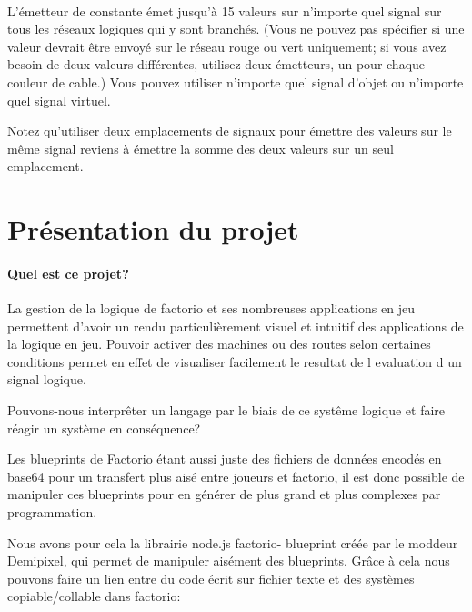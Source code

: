 \documentclass{scrreprt}
\begin{document}
	\paragraph{}
	L'émetteur de constante émet jusqu'à 15 valeurs sur n'importe quel signal sur tous les réseaux logiques qui y sont branchés. 
	(Vous ne pouvez pas spécifier si une valeur devrait être envoyé sur le réseau rouge ou vert uniquement; si vous avez besoin de deux valeurs différentes, utilisez deux émetteurs, un pour chaque couleur de cable.) 
	Vous pouvez utiliser n'importe quel signal d'objet ou n'importe quel signal virtuel.
	
	\begin{info}
		Notez qu'utiliser deux emplacements de signaux pour émettre des valeurs sur le même signal reviens à émettre la somme des deux valeurs sur un seul emplacement.
	\end{info}
	
	\section{Présentation du projet}
	
	\paragraph{Quel est ce projet?}
	
	La gestion de la logique de factorio et ses nombreuses applications en jeu permettent d'avoir un rendu particulièrement visuel et intuitif des applications de la logique en jeu.
	Pouvoir activer des machines ou des routes selon certaines conditions permet en effet de visualiser facilement le resultat de l evaluation d un signal logique.
	
	\begin{problem}
		Pouvons-nous interprêter un langage par le biais de ce systême logique et faire réagir un système en conséquence?
	\end{problem}
	
	Les blueprints de Factorio étant aussi juste des fichiers de données encodés en base64 pour un transfert plus aisé entre joueurs et factorio, il est donc possible de manipuler ces blueprints pour en générer de plus grand et plus complexes par programmation.
	
	Nous avons pour cela la librairie node.js factorio- blueprint créée par le moddeur Demipixel, qui permet de manipuler aisément des blueprints.
	Grâce à cela nous pouvons faire un lien entre du code écrit sur fichier texte et des systèmes copiable/collable dans factorio:
	
\end{document}
